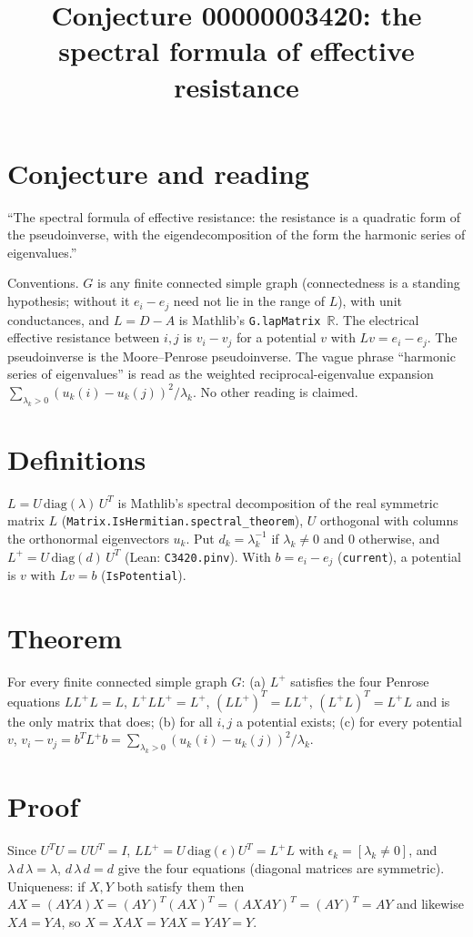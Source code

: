 \documentclass[11pt]{article}
\title{Conjecture 00000003420: the spectral formula of effective resistance}
\author{}
\date{}
\begin{document}
\maketitle

\section*{Conjecture and reading}
``The spectral formula of effective resistance: the resistance is a quadratic form of the pseudoinverse, with the eigendecomposition of the form the harmonic series of eigenvalues.''

Conventions. $G$ is any finite connected simple graph (connectedness is a standing hypothesis; without it $e_i-e_j$ need not lie in the range of $L$), with unit conductances, and $L=D-A$ is Mathlib's \texttt{G.lapMatrix $\mathbb R$}. The electrical effective resistance between $i,j$ is $v_i-v_j$ for a potential $v$ with $Lv=e_i-e_j$. The pseudoinverse is the Moore--Penrose pseudoinverse. The vague phrase ``harmonic series of eigenvalues'' is read as the weighted reciprocal-eigenvalue expansion $\sum_{\lambda_k>0}(u_k(i)-u_k(j))^2/\lambda_k$. No other reading is claimed.

\section*{Definitions}
$L=U\,\mathrm{diag}(\lambda)\,U^T$ is Mathlib's spectral decomposition of the real symmetric matrix $L$ (\texttt{Matrix.IsHermitian.spectral\_theorem}), $U$ orthogonal with columns the orthonormal eigenvectors $u_k$. Put $d_k=\lambda_k^{-1}$ if $\lambda_k\ne0$ and $0$ otherwise, and $L^+=U\,\mathrm{diag}(d)\,U^T$ (Lean: \texttt{C3420.pinv}). With $b=e_i-e_j$ (\texttt{current}), a potential is $v$ with $Lv=b$ (\texttt{IsPotential}).

\section*{Theorem}
For every finite connected simple graph $G$: (a) $L^+$ satisfies the four Penrose equations $LL^+L=L$, $L^+LL^+=L^+$, $(LL^+)^T=LL^+$, $(L^+L)^T=L^+L$ and is the only matrix that does; (b) for all $i,j$ a potential exists; (c) for every potential $v$, $v_i-v_j=b^TL^+b=\sum_{\lambda_k>0}(u_k(i)-u_k(j))^2/\lambda_k$.

\section*{Proof}
Since $U^TU=UU^T=I$, $LL^+=U\,\mathrm{diag}(\epsilon)U^T=L^+L$ with $\epsilon_k=[\lambda_k\ne0]$, and $\lambda\,d\,\lambda=\lambda$, $d\,\lambda\,d=d$ give the four equations (diagonal matrices are symmetric). Uniqueness: if $X,Y$ both satisfy them then $AX=(AYA)X=(AY)^T(AX)^T=(AXAY)^T=(AY)^T=AY$ and likewise $XA=YA$, so $X=XAX=YAX=YAY=Y$.
\end{document}
